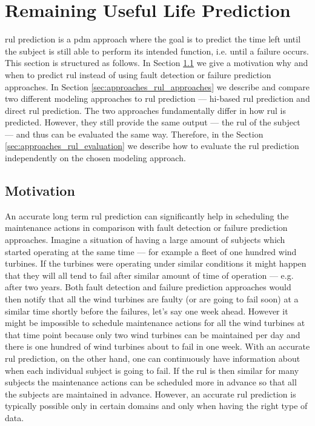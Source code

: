 \section{Remaining Useful Life Prediction}
\label{sec:approaches_prognostics}

\Acrfull{rul} prediction is a \gls{pdm} approach where the goal is to predict the time left until the subject is still able to perform its intended function, i.e. until a failure occurs.
This section is structured as follows.
In Section \ref{sec:approaches_rul_motivation} we give a motivation why and when to predict \acrshort{rul} instead of using fault detection or failure prediction approaches.
In Section \ref{sec:approaches_rul_approaches} we describe and compare two different modeling approaches to \acrshort{rul} prediction --- \acrshort{hi}-based \acrshort{rul} prediction and direct \acrshort{rul} prediction.
The two approaches fundamentally differ in how \acrshort{rul} is predicted.
However, they still provide the same output --- the \acrshort{rul} of the subject --- and thus can be evaluated the same way.
Therefore, in the Section \ref{sec:approaches_rul_evaluation} we describe how to evaluate the \acrshort{rul} prediction independently on the chosen modeling approach.

\subsection{Motivation}
\label{sec:approaches_rul_motivation}

An accurate long term \acrshort{rul} prediction can significantly help in scheduling the maintenance actions in comparison with fault detection or failure prediction approaches.
Imagine a situation of having a large amount of subjects which started operating at the same time --- for example a fleet of one hundred wind turbines.
If the turbines were operating under similar conditions it might happen that they will all tend to fail after similar amount of time of operation --- e.g. after two years.
Both fault detection and failure prediction approaches would then notify that all the wind turbines are faulty (or are going to fail soon) at a similar time shortly before the failures, let's say one week ahead.
However it might be impossible to schedule maintenance actions for all the wind turbines at that time point because only two wind turbines can be maintained per day and there is one hundred of wind turbines about to fail in one week.
With an accurate \acrshort{rul} prediction, on the other hand, one can continuously have information about when each individual subject is going to fail.
If the \acrshort{rul} is then similar for many subjects the maintenance actions can be scheduled more in advance so that all the subjects are maintained in advance.
However, an accurate \acrshort{rul} prediction is typically possible only in certain domains and only when having the right type of data.

